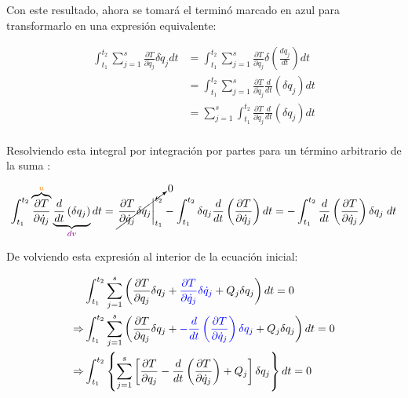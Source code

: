 \documentclass[/home/hernan/Documentos/Apuntes_mecanica_teorica/main.tex]{subfiles}
\begin{document}
    Con este resultado, ahora se tomará el terminó marcado en azul para transformarlo en una expresión equivalente:

    \begin{align*}
        \int_{t_1}^{t_2} \sum_{j=1}^{s} \frac{\partial T}{\partial \dot{q}_{j}} \delta \dot{q}_{j} dt & = \int_{t_1}^{t_2} \sum_{j=1}^{s} \frac{\partial T}{\partial \dot{q}_{j}} \delta \left(\frac{d q_{j}}{d t}\right) dt \\ 
        & = \int_{t_1}^{t_2} \sum_{j=1}^{s} \frac{\partial T}{\partial \dot{q}_{j}} \frac{d}{d t} \left(\delta  q_{j}\right) dt \\ 
        & = \sum_{j=1}^{s} \int_{t_1}^{t_2} \frac{\partial T}{\partial \dot{q}_{j}} \frac{d}{d t} \left(\delta  q_{j}\right) dt \\ 
    \end{align*}

    Resolviendo esta integral por integración por partes para un término arbitrario de la suma :

    \begin{align*}
        \int_{t_1}^{t_2} \overbrace{\frac{\partial T}{\partial \dot{q}_{j}}}^{\textcolor{orange}{u}} \underbrace{\frac{d}{d t} \left(\delta  q_{j}\right)}_{\textcolor{violet}{dv} } dt & = \cancelto{0}{\left.  \frac{\partial T}{\partial \dot{q}_{j}} \delta  q_{j}  \right|_{t_1}^{t_2}} - \int_{t_1}^{t_2}  \delta  q_{j} \frac{d}{d t} \left(\frac{\partial T}{\partial \dot{q}_{j}} \right) dt =  - \int_{t_1}^{t_2}  \frac{d}{d t} \left(\frac{\partial T}{\partial \dot{q}_{j}} \right)  \delta  q_{j}  \; dt \\ 
    \end{align*}

    De volviendo esta expresión al interior de la ecuación inicial:

    \begin{align*}
        & \int_{t_1}^{t_2} \sum_{j=1}^{s}  \left(\frac{\partial T}{\partial q_{j}} \delta q_{j} + \textcolor{blue}{\frac{\partial T}{\partial \dot{q}_{j}} \delta \dot{q}_{j}}   + Q_{j} \delta q_{j} \right) dt = 0 \\ 
        \Rightarrow  & \int_{t_1}^{t_2} \sum_{j=1}^{s}  \left(\frac{\partial T}{\partial q_{j}} \delta q_{j} + \textcolor{blue}{- \frac{d}{d t} \left(\frac{\partial T}{\partial \dot{q}_{j}} \right)  \delta  q_{j}}   + Q_{j} \delta q_{j} \right) dt = 0 \\ 
        \Rightarrow  & \int_{t_1}^{t_2} \left \{ \sum_{j=1}^{s}  \left[\frac{\partial T}{\partial q_{j}}  - \frac{d}{d t} \left(\frac{\partial T}{\partial \dot{q}_{j}} \right)     + Q_{j}  \right] \delta q_{j} \right\}  dt = 0
    \end{align*}
\end{document}
